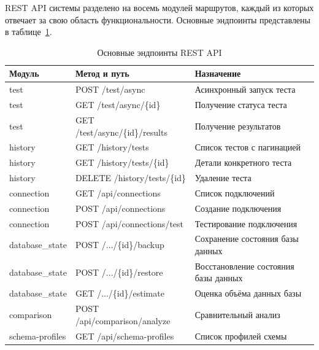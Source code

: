 REST API системы разделено на восемь модулей маршрутов, каждый из которых отвечает за свою область функциональности. Основные эндпоинты представлены в таблице~\ref{tab:api_endpoints}.

\begin{table}
    \centering
    \caption{Основные эндпоинты REST API}
    \label{tab:api_endpoints}
    \begin{tabularx}{\textwidth}{|>{\RaggedRight}X|>{\RaggedRight}X|>{\RaggedRight}X|}
        \hline
        Модуль & Метод и путь & Назначение \\
        \hline
        test & POST /test/async & Асинхронный запуск теста \\
        \hline
        test & GET /test/async/\{id\} & Получение статуса теста \\
        \hline
        test & GET /test/async/\{id\}/results & Получение результатов \\
        \hline
        history & GET /history/tests & Список тестов с пагинацией \\
        \hline
        history & GET /history/tests/\{id\} & Детали конкретного теста \\
        \hline
        history & DELETE /history/tests/\{id\} & Удаление теста \\
        \hline
        connection & GET /api/connections & Список подключений \\
        \hline
        connection & POST /api/connections & Создание подключения \\
        \hline
        connection & POST /api/connections/test & Тестирование подключения \\
        \hline
        database\_state & POST /.../\{id\}/backup & Сохранение состояния базы данных \\
        \hline
        database\_state & POST /.../\{id\}/restore & Восстановление состояния базы данных \\
        \hline
        database\_state & GET /.../\{id\}/estimate & Оценка объёма данных базы \\
        \hline
        comparison & POST /api/comparison/analyze & Сравнительный анализ \\
        \hline
        schema-profiles & GET /api/schema-profiles & Список профилей схемы \\
        \hline
    \end{tabularx}
\end{table}

